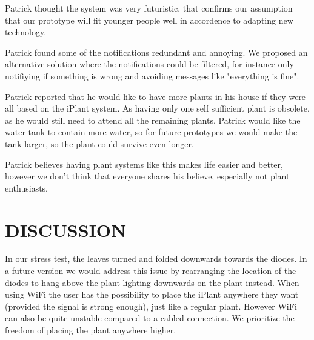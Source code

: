 \documentclass{ubicomp2012}
\begin{document}
Patrick thought the system was very futuristic, that confirms our assumption that our prototype will fit younger people well in accordence to adapting new technology.

Patrick found some of the notifications redundant and annoying. We proposed an alternative solution where the notifications could be filtered, for instance only notifiying if something is wrong and avoiding messages like "everything is fine".

Patrick reported that he would like to have more plants in his house if they were all based on the iPlant system. As having only one self sufficient plant is obsolete, as he would still need to attend all the remaining plants.
Patrick would like the water tank to contain more water, so for future prototypes we would make the tank larger, so the plant could survive even longer.

Patrick believes having plant systems like this makes life easier and better, however we don't think that everyone shares his believe, especially not plant enthusiasts.






\section{DISCUSSION}
In our stress test, the leaves turned and folded downwards towards the diodes. In a future version we would address this issue by rearranging the location of the diodes to hang above the plant lighting downwards on the plant instead.
When using WiFi the user has the possibility to place the iPlant anywhere they want (provided the signal is strong enough), just like a regular plant. However WiFi can also be quite unstable compared to a cabled connection. We prioritize the freedom of placing the plant anywhere higher.
\end{document}
